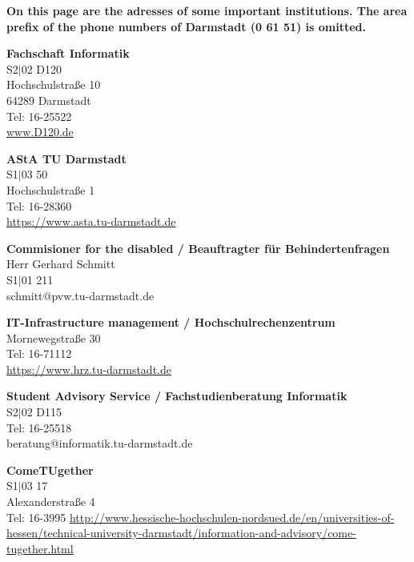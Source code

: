 \newpage


\textbf{On this page are the adresses of some important institutions. The area prefix of the phone numbers of Darmstadt (0 61 51) is omitted.}

\begin{multicols}{2}

    \textbf{Fachschaft Informatik}\\
    S2$|$02 D120\\
    Hochschulstraße 10\\
    64289 Darmstadt\\
    Tel: 16-25522\\
    \url{www.D120.de}

    \vspace{3mm}
    \textbf{AStA TU Darmstadt}\\
    S1$|$03 50\\
    Hochschulstraße 1\\
    Tel: 16-28360\\
    \url{https://www.asta.tu-darmstadt.de}

    \vspace{3mm}
    \textbf{Commisioner for the disabled / Beauftragter für Behindertenfragen}\\
    Herr Gerhard Schmitt\\
    S1$|$01 211\\
    schmitt@pvw.tu-darmstadt.de

    \vspace{3mm}
    \textbf{IT-Infrastructure management / Hochschulrechenzentrum}\\
    Mornewegstraße 30 \\
    Tel: 16-71112\\
    \url{https://www.hrz.tu-darmstadt.de}

    \vspace{3mm}
    \textbf{Student Advisory Service / Fachstudienberatung Informatik}\\
    S2$|$02 D115\\
    Tel: 16-25518 \\
    beratung@informatik.tu-darmstadt.de

    \vspace{3mm}
    \textbf{ComeTUgether}\\
    S1$|$03 17\\
    Alexanderstraße 4\\
    Tel: 16-3995
    \url{http://www.hessische-hochschulen-nordsued.de/en/universities-of-hessen/technical-university-darmstadt/information-and-advisory/come-tugether.html}


\end{multicols}
